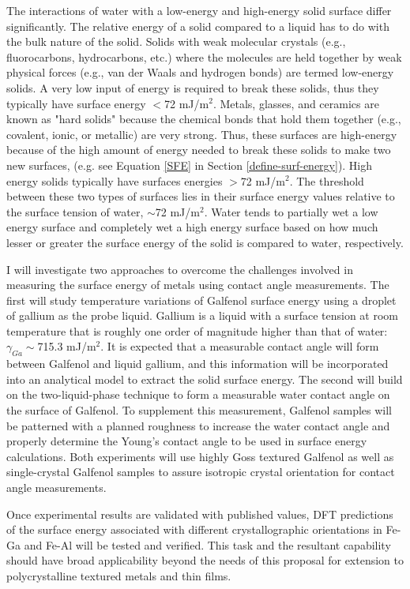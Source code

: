 
The interactions of water with a low-energy and high-energy solid surface differ significantly. The relative energy of a solid compared to a liquid has to do with the bulk nature of the solid. Solids with weak molecular crystals (e.g., fluorocarbons, hydrocarbons, etc.) where the molecules are held together by weak physical forces (e.g., van der Waals and hydrogen bonds) are termed low-energy solids. A very low input of energy is required to break these solids, thus they typically have surface energy $<$72 mJ/m$^2$.  Metals, glasses, and ceramics are known as "hard solids" because the chemical bonds that hold them together (e.g., covalent, ionic, or metallic) are very strong. Thus, these surfaces are high-energy because of the high amount of energy needed to break these solids to make two new surfaces, (e.g. see Equation \ref{SFE} in Section \ref{define-surf-energy}). High energy solids typically have surfaces energies $>$72 mJ/m$^2$.  The threshold between these two types of surfaces lies in their surface energy values relative to the surface tension of water, $\sim$72 mJ/m$^2$. Water tends to partially wet a low energy surface and completely wet a high energy surface based on how much lesser or greater the surface energy of the solid is compared to water, respectively. 

I will investigate two approaches to overcome the challenges involved in measuring the surface energy of metals using contact angle measurements. The first will study temperature variations of Galfenol surface energy using a droplet of gallium as the probe liquid. Gallium is a liquid with a surface tension at room temperature that is roughly one order of magnitude higher than that of water: $\gamma_{Ga}\sim$715.3 mJ/m$^2$. It is expected that a measurable contact angle will form between Galfenol and liquid gallium, and this information will be incorporated into an analytical model to extract the solid surface energy. The second will build on the two-liquid-phase technique to form a measurable water contact angle on the surface of Galfenol. To supplement this measurement, Galfenol samples will be patterned with a planned roughness to increase the water contact angle and properly determine the Young's contact angle to be used in surface energy calculations. Both experiments will use highly Goss textured Galfenol as well as single-crystal Galfenol samples to assure isotropic crystal orientation for contact angle measurements. 

Once experimental results are validated with published values, DFT predictions of the surface energy associated with different crystallographic orientations in Fe-Ga and Fe-Al will be tested and verified. This task and the resultant capability should have broad applicability beyond the needs of this proposal for extension to polycrystalline textured metals and thin films.
%


